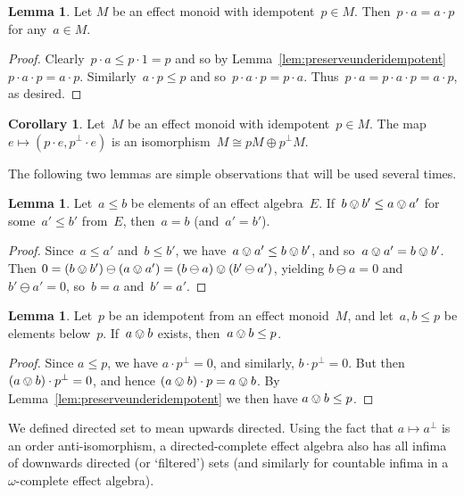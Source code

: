 \documentclass[10pt,conference]{IEEEtran}
\newcounter{counter}
\theoremstyle{definition}
\newtheorem{lemma}[counter]{Lemma}
\newtheorem{corollary}[counter]{Corollary}
\begin{document}
\begin{lemma}\label{lem:idempotentscommute}
    Let $M$ be an effect monoid with idempotent~$p \in M$.
Then~$p\cdot a = a \cdot p$ for any~$a \in M$.
\end{lemma}
\begin{proof}
Clearly~$p\cdot a \leq p \cdot 1 = p$
    and so by Lemma~\ref{lem:preserveunderidempotent}
    $p \cdot a \cdot p = a \cdot p$.
    Similarly~$a \cdot p \leq p$ and so~$p \cdot a \cdot p = p \cdot a$.
    Thus~$p\cdot a = p\cdot a\cdot p = a \cdot p$, as desired.
\end{proof}
\begin{corollary}\label{cor:corneriso}
    Let~$M$ be an effect monoid with idempotent~${p \in M}$.
    The map~$e \mapsto (p \cdot e, p^\perp \cdot e)$
    is an isomorphism~$M \cong pM \oplus p^\perp M$.
\end{corollary}


The following two lemmas are simple observations
that will be used several times.
\begin{lemma}
\label{lem:forcing}
Let~$a\leq b$ be elements of an effect algebra~$E$.
If~$ b\ovee b'\leq a\ovee a'$ for some~$a'\leq b'$ from~$E$,
    then~$a=b$ (and~$a'=b'$).
\end{lemma}
\begin{proof}
    Since~$a\leq a'$ and~$b\leq b'$,
    we have~$a\ovee a'\leq b\ovee b'$,
    and so~$a\ovee a' = b\ovee b'$.
Then  $0 = (b\ovee b') \ominus (a\ovee a')=
    (b\ominus a)\ovee (b'\ominus a')$,
    yielding $b\ominus a= 0$
    and $b'\ominus a'=0$,
so~$b=a$ and~$b'=a'$.
\end{proof}

\begin{lemma}\label{lem:summableunderidempotent}
Let~$p$ be an idempotent from an effect monoid~$M$,
    and let~$a,b\leq p$ be elements below~$p$.
If~$a\ovee b$ exists,
then~$a\ovee b\leq p$.
\end{lemma}
\begin{proof}
    Since $a\leq p$, we have $a \cdot p^\perp = 0$,
    and similarly, $b\cdot p^\perp=0$.
    But then $(a\ovee b)\cdot p^\perp
    = 0$, and hence $(a \ovee b)\cdot p = a\ovee b$. By
    Lemma~\ref{lem:preserveunderidempotent} we then have $a\ovee b\leq
    p$.
\end{proof}

We defined directed set to mean upwards directed. Using the fact
that $a \mapsto a^\perp$ is an order anti-isomorphism, a directed-complete
effect algebra also has all infima of downwards directed (or `filtered') 
sets (and similarly for countable infima in a $\omega$-complete effect algebra).
\end{document}
